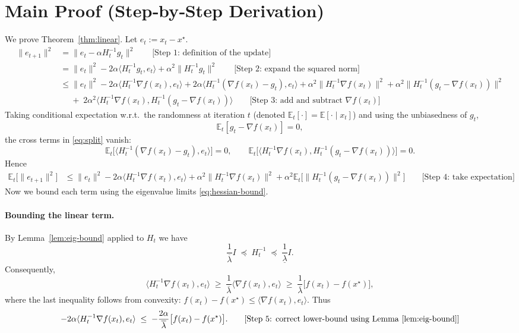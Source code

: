 \documentclass{article}
\newcommand{\E}{\mathbb{E}}
\begin{document}
\section*{Main Proof (Step‑by‑Step Derivation)}
We prove Theorem~\ref{thm:linear}. Let $e_{t}:=x_{t}-x^{\star}$.
\begin{align}
\|e_{t+1}\|^{2}
&= \bigl\|e_{t}-\alpha H_{t}^{-1}g_{t}\bigr\|^{2}
   \qquad\text{[Step 1: definition of the update]} \nonumber\\
&= \|e_{t}\|^{2}
   -2\alpha\langle H_{t}^{-1}g_{t},e_{t}\rangle
   +\alpha^{2}\|H_{t}^{-1}g_{t}\|^{2}
   \qquad\text{[Step 2: expand the squared norm]} \label{eq:expand}\\
&\le \|e_{t}\|^{2}
   -2\alpha\langle H_{t}^{-1}\nabla f(x_{t}),e_{t}\rangle
   +2\alpha\langle H_{t}^{-1}( \nabla f(x_{t})-g_{t}),e_{t}\rangle
   +\alpha^{2}\|H_{t}^{-1}\nabla f(x_{t})\|^{2}
   +\alpha^{2}\|H_{t}^{-1}(g_{t}-\nabla f(x_{t}))\|^{2}
   \nonumber\\
&\quad\;+\;2\alpha^{2}\langle H_{t}^{-1}\nabla f(x_{t}),H_{t}^{-1}(g_{t}-\nabla f(x_{t}))\rangle
   \qquad\text{[Step 3: add and subtract $\nabla f(x_{t})$]} \label{eq:split}
\end{align}
Taking conditional expectation w.r.t.\ the randomness at iteration $t$ (denoted $\E_{t}[\cdot]=\E[\cdot\mid x_{t}]$) and using the unbiasedness of $g_{t}$,
\[
\E_{t}[g_{t}-\nabla f(x_{t})]=0,
\]
the cross terms in \eqref{eq:split} vanish:
\[
\E_{t}\big[\langle H_{t}^{-1}( \nabla f(x_{t})-g_{t}),e_{t}\rangle\big]=0,
\qquad
\E_{t}\big[\langle H_{t}^{-1}\nabla f(x_{t}),H_{t}^{-1}(g_{t}-\nabla f(x_{t}))\rangle\big]=0.
\]
Hence
\begin{align}
\E_{t}\!\big[\|e_{t+1}\|^{2}\big]
&\le \|e_{t}\|^{2}
   -2\alpha\langle H_{t}^{-1}\nabla f(x_{t}),e_{t}\rangle
   +\alpha^{2}\|H_{t}^{-1}\nabla f(x_{t})\|^{2}
   +\alpha^{2}\E_{t}\!\big[\|H_{t}^{-1}(g_{t}-\nabla f(x_{t}))\|^{2}\big]
   \qquad\text{[Step 4: take expectation]} \label{eq:exp1}
\end{align}
Now we bound each term using the eigenvalue limits \eqref{eq:hessian-bound}.

\paragraph{Bounding the linear term.}
By Lemma~\ref{lem:eig-bound} applied to $H_{t}$ we have
\[
\frac{1}{\overline{\lambda}} I \;\preceq\; H_{t}^{-1} \;\preceq\; \frac{1}{\underline{\lambda}} I .
\]
Consequently,
\[
\langle H_{t}^{-1}\nabla f(x_{t}),e_{t}\rangle
\;\ge\;
\frac{1}{\overline{\lambda}}\langle \nabla f(x_{t}),e_{t}\rangle
\;\ge\;
\frac{1}{\overline{\lambda}}\bigl[f(x_{t})-f(x^{\star})\bigr],
\]
where the last inequality follows from convexity:
$f(x_{t})-f(x^{\star})\le\langle \nabla f(x_{t}),e_{t}\rangle$.
Thus
\[
-2\alpha\langle H_{t}^{-1}\nabla f(x_{t}),e_{t}\rangle
\;\le\;
-\frac{2\alpha}{\overline{\lambda}}\bigl[f(x_{t})-f(x^{\star})\bigr].
\qquad\text{[Step 5: correct lower‑bound using Lemma~\ref{lem:eig-bound}]}
\]
\end{document}
